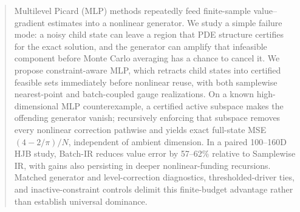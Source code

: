 \documentclass{article}
\begin{document}
\printAffiliationsAndNotice{}

\begin{abstract}
Multilevel Picard (MLP) methods repeatedly feed finite-sample value--gradient estimates into a nonlinear generator. We study a simple failure mode: a noisy child state can leave a region that PDE structure certifies for the exact solution, and the generator can amplify that infeasible component before Monte Carlo averaging has a chance to cancel it. We propose constraint-aware MLP, which retracts child states into certified feasible sets immediately before nonlinear reuse, with both samplewise nearest-point and batch-coupled gauge realizations. On a known high-dimensional MLP counterexample, a certified active subspace makes the offending generator vanish; recursively enforcing that subspace removes every nonlinear correction pathwise and yields exact full-state MSE $(4-2/\pi)/N$, independent of ambient dimension. In a paired 100--160D HJB study, Batch-IR reduces value error by 57--62\% relative to Samplewise IR, with gains also persisting in deeper nonlinear-funding recursions. Matched generator and level-correction diagnostics, thresholded-driver ties, and inactive-constraint controls delimit this finite-budget advantage rather than establish universal dominance.
\end{abstract}
\end{document}
